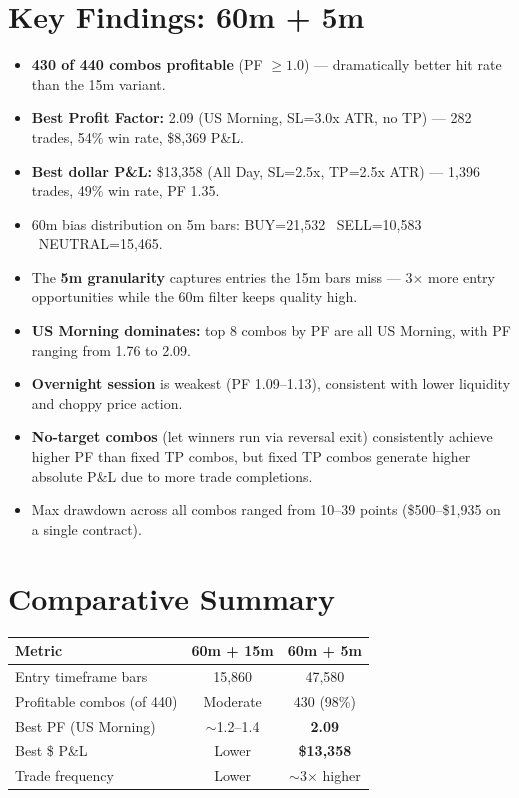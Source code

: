\documentclass[11pt]{article}
\begin{document}
\section*{Key Findings: 60m + 5m}
\begin{itemize}[leftmargin=1.5em]
    \item \textbf{430 of 440 combos profitable} (PF $\geq 1.0$) --- dramatically better hit rate than the 15m variant.
    \item \textbf{Best Profit Factor:} 2.09 (US Morning, SL=3.0x ATR, no TP) --- 282 trades, 54\% win rate, \$8{,}369 P\&L.
    \item \textbf{Best dollar P\&L:} \$13{,}358 (All Day, SL=2.5x, TP=2.5x ATR) --- 1{,}396 trades, 49\% win rate, PF 1.35.
    \item 60m bias distribution on 5m bars: BUY=21{,}532 \textbar\ SELL=10{,}583 \textbar\ NEUTRAL=15{,}465.
    \item The \textbf{5m granularity} captures entries the 15m bars miss --- 3$\times$ more entry opportunities while the 60m filter keeps quality high.
    \item \textbf{US Morning dominates:} top 8 combos by PF are all US Morning, with PF ranging from 1.76 to 2.09.
    \item \textbf{Overnight session} is weakest (PF 1.09--1.13), consistent with lower liquidity and choppy price action.
    \item \textbf{No-target combos} (let winners run via reversal exit) consistently achieve higher PF than fixed TP combos, but fixed TP combos generate higher absolute P\&L due to more trade completions.
    \item Max drawdown across all combos ranged from 10--39 points (\$500--\$1{,}935 on a single contract).
\end{itemize}

\section*{Comparative Summary}

\begin{center}
\begin{tabular}{lcc}
\toprule
\textbf{Metric} & \textbf{60m + 15m} & \textbf{60m + 5m} \\
\midrule
Entry timeframe bars & 15{,}860 & 47{,}580 \\
Profitable combos (of 440) & Moderate & 430 (98\%) \\
Best PF (US Morning) & $\sim$1.2--1.4 & \textbf{2.09} \\
Best \$ P\&L & Lower & \textbf{\$13{,}358} \\
Trade frequency & Lower & $\sim$3$\times$ higher \\
\bottomrule
\end{tabular}
\end{center}
\end{document}
